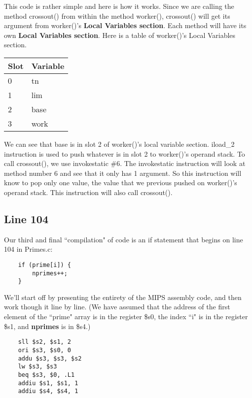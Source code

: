 \documentclass[11pt]{article}
\begin{document}
This code is rather simple and here is how it works. Since we are calling the method crossout() from within the method worker(), crossout() will get its argument from worker()'s {\bf Local Variables section}. Each method will have its own {\bf Local Variables section}. Here is a table of worker()'s Local Variables section.

\begin{table}[h]
    \begin{tabular}{|l|l|}
        \hline
        Slot & Variable \\ \hline
        0    & tn       \\ 
        1    & lim      \\ 
        2    & base     \\ 
        3    & work     \\
        \hline
    \end{tabular}
\end{table}

We can see that base is in slot 2 of worker()'s local variable section. iload\_2 instruction is used to push whatever is in slot 2 to worker()'s operand stack. To call crossout(), we use invokestatic \#6. The invokestatic instruction will look at method number 6 and see that it only has 1 argument. So this instruction will know to pop only one value, the value that we previous pushed on worker()'s operand stack. This instruction will also call crossout().




\subsection{Line 104}
Our third and final ``compilation" of code is an if statement that begins on line 104 in Primes.c:

\begin{verbatim}
    if (prime[i]) {
        nprimes++;
    }
\end{verbatim}

We'll start off by presenting the entirety of the MIPS assembly code, and then work though it line by line. (We have assumed that the address of the first element of the ``prime" array is in the register \$s0, the index ``i" is in the register \$s1, and \textbf{nprimes} is in \$s4.)

\begin{verbatim}
    sll $s2, $s1, 2
    ori $s3, $s0, 0
    addu $s3, $s3, $s2
    lw $s3, $s3
    beq $s3, $0, .L1
    addiu $s1, $s1, 1
    addiu $s4, $s4, 1
\end{verbatim}
\end{document}
